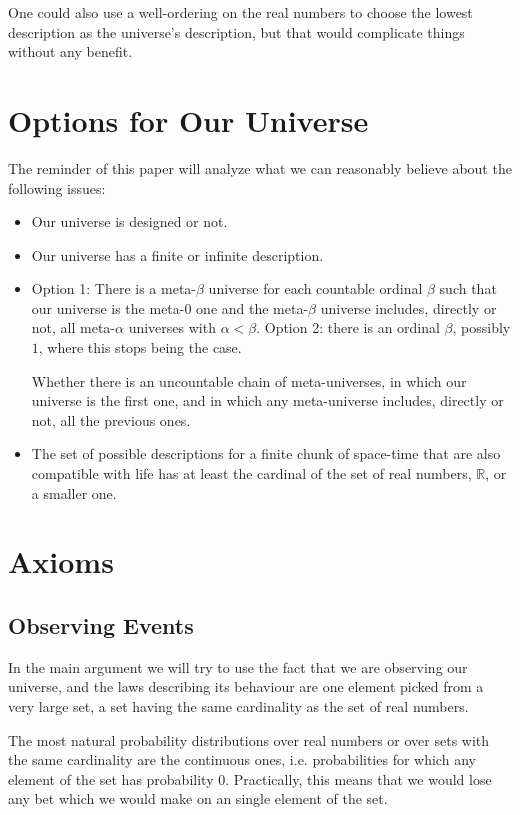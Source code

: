 \documentclass[a4paper
]{article}
\def\reale{\mathbb{R}}
\begin{document}
One could also use a well-ordering on the real numbers to choose the
lowest description as the universe's description, but that would
complicate things without any benefit.

\section{Options for Our Universe}
\label{sec:options}

The reminder of this paper will analyze what we can reasonably believe about
the following issues:
\begin{itemize}
  \item Our universe is designed or not.
  \item Our universe has a finite or infinite description.
  \item Option 1: There is a meta-$\beta$ universe for each countable ordinal
        $\beta$ such that our universe is the meta-$0$ one and the meta-$\beta$
        universe includes, directly or not, all meta-$\alpha$ universes with
        $\alpha < \beta$.
        Option 2: there is an ordinal $\beta$, possibly $1$,
        where this stops being the case.

        Whether there is an uncountable chain of meta-universes, in which
        our universe is the first one, and in which any meta-universe
        includes, directly or not, all the previous ones.
  \item The set of possible descriptions for a finite chunk of space-time
        that are also compatible with life has at least the cardinal
        of the set of real numbers, $\reale$, or a smaller one.
\end{itemize}

\section{Axioms}
\label{sec:axioms}

\subsection{Observing Events}
In the main argument we will try to use the fact that we are observing our
universe, and the laws describing its behaviour are one element picked from
a very large set, a set having the same cardinality as the set of real numbers.

The most natural probability distributions over real numbers
or over sets with the same cardinality are the continuous
ones, i.e. probabilities for which any element of the set has probability $0$.
Practically, this means that we would lose any bet which we would make on an
single element of the set.
\end{document}
